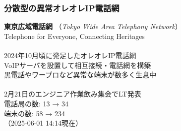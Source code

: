 \documentclass[
  lualatex,
  aspectratio=169,
  14pt
]{beamer}
\begin{document}
\begin{frame}
  \frametitle{分散型の異常オレオレIP電話網}

  \textbf{東京広域電話網}
  （\textit{Tokyo Wide Area Telephony Network}）\\
  \hspace{1.5\zw}Telephone for Everyone, Connecting Heritages
  \\~\\[-.5\baselineskip]

  2024年10月頃に発足したオレオレIP電話網\\
  \hspace{1.5\zw}VoIPサーバを設置して相互接続・電話網を構築\\
  \hspace{1.5\zw}黒電話やワープロなど異常な端末が数多く生息中
  \\~\\[-.5\baselineskip]

  2月21日のエンジニア作業飲み集会でLT発表\\
  \hspace{1.5\zw}電話局の数: 13 → 34\\
  \hspace{2.5\zw}端末の数: 58 → 234\\
  \hspace{1.5\zw}（2025-06-01 14:14現在）

\end{frame}
\end{document}

